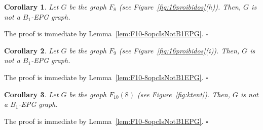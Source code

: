 \documentclass[9pt]{entcs}
\newtheorem{coro}{Corollary}[section]
\begin{document}


\begin{coro}\label{coro:f8}
Let $G$ be the graph $F_{8}$ (see Figure~\ref{fig:16proibidos}(h)). Then, $G$ is not a $B_1$-EPG graph. 
\end{coro}
\begin{pf}
The proof is immediate by Lemma~\ref{lem:F10-8opcIsNotB1EPG}. $\square$
\end{pf}

\begin{coro}\label{coro:f9}
Let $G$ be the graph $F_{9}$ (see Figure~\ref{fig:16proibidos}(i)). Then, $G$ is not a $B_1$-EPG  graph. 
\end{coro}
\begin{pf}
The proof is immediate by Lemma~\ref{lem:F10-8opcIsNotB1EPG}. $\square$
\end{pf}



\begin{coro}\label{coro:F108IsNotB1EPG}
Let $G$ be the graph $F_{10}(8)$ (see Figure~\ref{fig:ktent}). Then, $G$ is not a $B_1$-EPG graph. 
\end{coro}

\begin{pf}
The proof is immediate by Lemma~\ref{lem:F10-8opcIsNotB1EPG}. $\square$
\end{pf}


\end{document}
